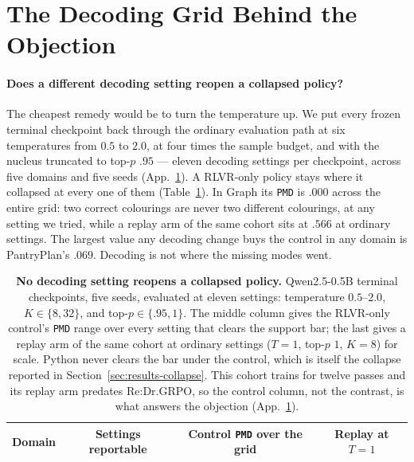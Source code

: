 \documentclass{article}
\newcommand{\1}{\mathbf 1}
\newcommand{\pmd}{\texttt{PMD}}
\theoremstyle{remark}
\theoremstyle{definition}
\theoremstyle{plain}
\begin{document}
\clearpage
\section{The Decoding Grid Behind the Objection}
\label{app:decoding-objection}

\paragraph{Does a different decoding setting reopen a collapsed policy?}
The cheapest remedy would be to turn the temperature up. We put every frozen
terminal checkpoint back through the ordinary evaluation path at six
temperatures from $0.5$ to $2.0$, at four times the sample budget, and with the
nucleus truncated to top-$p$ $.95$ --- eleven decoding settings per checkpoint,
across five domains and five seeds (App.~\ref{app:decoding-objection}). A
RLVR-only policy stays where it collapsed at every one of them
(Table~\ref{tab:decoding-objection}). In Graph its \pmd{} is $.000$ across the
entire grid: two correct colourings are never two different colourings, at any
setting we tried, while a replay arm of the same cohort sits at $.566$ at
ordinary settings. The largest value any decoding change buys the control in
any domain is PantryPlan's $.069$. Decoding is not where the missing modes went.

\begin{table}[!htbp]
  \centering
  \caption{\textbf{No decoding setting reopens a collapsed policy.}
  Qwen2.5-0.5B terminal checkpoints, five seeds, evaluated at eleven settings:
  temperature $0.5$--$2.0$, $K\in\{8,32\}$, and top-$p\in\{.95,1\}$. The middle
  column gives the RLVR-only control's \pmd{} range over every setting that
  clears the support bar; the last gives a replay arm of the same cohort at
  ordinary settings ($T=1$, top-$p$ $1$, $K=8$) for scale. Python never clears
  the bar under the control, which is itself the collapse reported in
  Section~\ref{sec:results-collapse}. This cohort trains for twelve passes and
  its replay arm predates Re:Dr.GRPO, so the control column, not the contrast,
  is what answers the objection (App.~\ref{app:decoding-objection}).}
  \label{tab:decoding-objection}
  \small
  \begin{tabular}{@{}lccc@{}}
    \toprule
    \textbf{Domain} & \textbf{Settings reportable} &
      \textbf{Control \pmd{} over the grid} & \textbf{Replay at $T=1$} \\
    \midrule
    
  \end{tabular}
\end{table}
\end{document}
